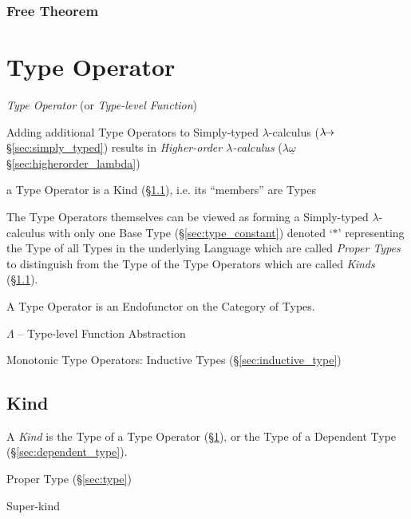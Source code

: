 \subsubsection{Free Theorem}\label{sec:free_theorem}



\section{Type Operator}\label{sec:type_operator}

\emph{Type Operator} (or \emph{Type-level Function})

Adding additional Type Operators to Simply-typed $\lambda$-calculus
($\lambda\kern-5pt\rightarrow$ \S\ref{sec:simply_typed}) results in
\emph{Higher-order $\lambda$-calculus} ($\lambda\underline{\omega}$
\S\ref{sec:higherorder_lambda})

a Type Operator is a Kind (\S\ref{sec:kind}), i.e. its ``members'' are
Types

The Type Operators themselves can be viewed as forming a Simply-typed
$\lambda$-calculus with only one Base Type (\S\ref{sec:type_constant})
denoted `$\ast$' representing the Type of all Types in the underlying
Language which are called \emph{Proper Types} to distinguish from the
Type of the Type Operators which are called \emph{Kinds}
(\S\ref{sec:kind}).

A Type Operator is an Endofunctor on the Category of Types.

$\Lambda$ -- Type-level Function Abstraction

Monotonic Type Operators: Inductive Types (\S\ref{sec:inductive_type})



\subsection{Kind}\label{sec:kind}

A \emph{Kind} is the Type of a Type Operator
(\S\ref{sec:type_operator}), or the Type of a Dependent Type
(\S\ref{sec:dependent_type}).

\fist Proper Type (\S\ref{sec:type})

Super-kind

